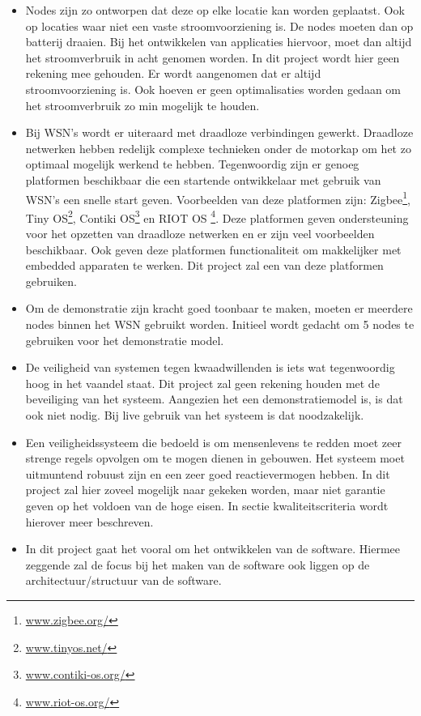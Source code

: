 \documentclass{../local}
\begin{document}
\begin{itemize}
\item Nodes zijn zo ontworpen dat deze op elke locatie kan worden geplaatst. Ook op locaties waar niet een vaste stroomvoorziening is. De nodes moeten dan op batterij draaien. Bij het ontwikkelen van applicaties hiervoor, moet dan altijd het stroomverbruik in acht genomen worden. In dit project wordt hier geen rekening mee gehouden. Er wordt aangenomen dat er altijd stroomvoorziening is. Ook hoeven er geen optimalisaties worden gedaan om het stroomverbruik zo min mogelijk te houden.

\item Bij WSN's wordt er uiteraard met draadloze verbindingen gewerkt. Draadloze netwerken hebben 
redelijk complexe technieken onder de motorkap om het zo optimaal mogelijk werkend te hebben. Tegenwoordig zijn er genoeg platformen beschikbaar die een startende ontwikkelaar met gebruik van WSN's een snelle start geven. Voorbeelden van deze platformen zijn: Zigbee\footnote{\url{www.zigbee.org/}}, Tiny OS\footnote{\url{www.tinyos.net/}}, Contiki OS\footnote{\url{www.contiki-os.org/}} en RIOT OS \footnote{\url{www.riot-os.org/}}. Deze platformen geven ondersteuning voor het opzetten van draadloze netwerken en er zijn veel voorbeelden beschikbaar. Ook geven deze platformen functionaliteit om makkelijker met embedded apparaten te werken. Dit project zal een van deze platformen gebruiken. 

\item Om de demonstratie zijn kracht goed toonbaar te maken, moeten er meerdere nodes binnen het WSN gebruikt worden. Initieel wordt gedacht om 5 nodes te gebruiken voor het demonstratie model.

\item De veiligheid van systemen tegen kwaadwillenden is iets wat tegenwoordig hoog in het vaandel staat. Dit project zal geen rekening houden met de beveiliging van het systeem. Aangezien het een demonstratiemodel is, is dat ook niet nodig. Bij live gebruik van het systeem is dat noodzakelijk.

\item Een veiligheidssysteem die bedoeld is om mensenlevens te redden moet zeer strenge regels opvolgen om te mogen dienen in gebouwen. Het systeem moet uitmuntend robuust zijn en een zeer goed reactievermogen hebben. In dit project zal hier zoveel mogelijk naar gekeken worden, maar niet garantie geven op het voldoen van de hoge eisen. In sectie kwaliteitscriteria wordt hierover meer beschreven.

\item In dit project gaat het vooral om het ontwikkelen van de software. Hiermee zeggende zal de focus bij het maken van de software ook liggen op de architectuur/structuur van de software.
\end{itemize}
\end{document}
